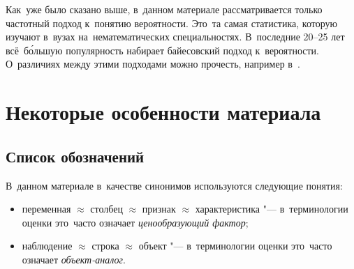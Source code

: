 \documentclass[]{scrartcl}
\begin{document}
Как~уже было сказано выше, в~данном материале рассматривается только частотный подход к~понятию вероятности. Это~та самая статистика, которую изучают в~вузах на~нематематических специальностях.   В~последние 20--25 лет всё~б\'ольшую популярность набирает байесовский подход к~вероятности. О~различиях между этими подходами можно прочесть, например в~\cite{Murashev:freq-baye-prob}.

\section{Некоторые особенности материала}
\subsection{Список обозначений}
В~данном материале в~качестве синонимов используются следующие понятия:
\begin{itemize}
	\item переменная $\approx$ столбец $\approx$ признак $\approx$ характеристика "--- в~терминологии оценки это~часто означает \emph{ценообразующий фактор};
	\item наблюдение $\approx$ строка $\approx$ объект "--- в~терминологии оценки это~часто означает \emph{объект-аналог}.
\end{itemize}
\end{document}
